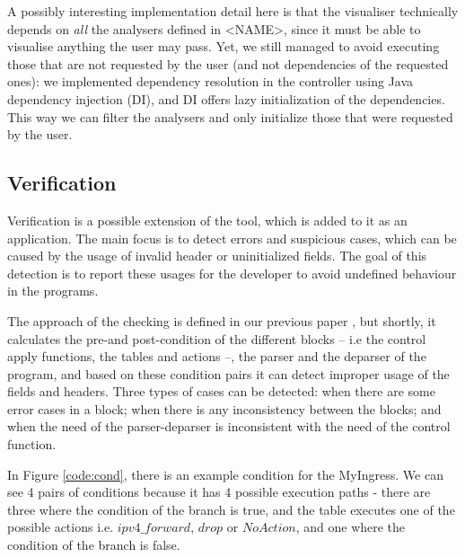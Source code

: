 \documentclass[sigconf]{acmart}
\begin{document}
  A possibly interesting implementation detail here is that the visualiser technically depends on \textit{all} the analysers defined in <NAME>, since it must be able to visualise anything the user may pass. Yet, we still managed to avoid executing those that are not requested by the user (and not dependencies of the requested ones): we implemented dependency resolution in the controller using Java dependency injection (DI), and DI offers lazy initialization of the dependencies. This way we can filter the analysers and only initialize those that were requested by the user.

  \subsection{Verification} %
  Verification is a possible extension of the tool, which is added to it as an application. The main focus is to detect errors and suspicious cases, which can be caused by the usage of invalid header or uninitialized fields. The goal of this detection is to report these usages for the developer to avoid undefined behaviour in the programs. 
  
  The approach of the checking is defined in our previous paper \cite{ownCheck}, but shortly, it calculates the pre-and post-condition of the different blocks -- i.e the control apply functions, the tables and actions --, the parser and the deparser of the program, and based on these condition pairs it can detect improper usage of the fields and headers. Three types of cases can be detected: when there are some error cases in a block; when there is any inconsistency between the blocks; and when the need of the parser-deparser is inconsistent with the need of the control function.
  
  In Figure \ref{code:cond}, there is an example condition for the MyIngress. We can see 4 pairs of conditions because it has 4 possible execution paths - there are three where the condition of the branch is true, and the table executes one of the possible actions i.e. $\mathit{ipv4\_forward}$, $\mathit{drop}$ or $\mathit{NoAction}$, and one where the condition of the branch is false.
  
\end{document}
